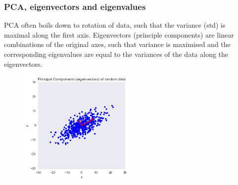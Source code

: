 \documentclass{beamer}
\begin{document}
\begin{frame}
\frametitle{PCA, eigenvectors and eigenvalues}
PCA often boils down to rotation of data, such that the variance (std) is maximal along the first axis. 
Eigenvectors (principle components) are linear combinations of the original axes, such that variance is maximised and the corresponding eigenvalues are equal to the variances of the data along the eigenvectors. 
\begin{figure}[t]
\begin{center}
\includegraphics[width=0.5\textwidth]{pca}
\caption{}
\end{center}
\end{figure}
\end{frame}
\end{document}
